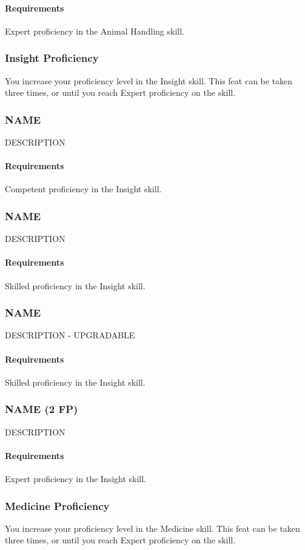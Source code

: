     \paragraph{Requirements} Expert proficiency in the Animal Handling skill.
\subsubsection{Insight Proficiency} \label{feat::insightprof}
    You increase your proficiency level in the Insight skill.
    This feat can be taken three times, or until you reach Expert proficiency on the skill.
\subsubsection{NAME} \label{feat::name}
    DESCRIPTION
    \paragraph{Requirements} Competent proficiency in the Insight skill.
\subsubsection{NAME} \label{feat::name}
    DESCRIPTION
    \paragraph{Requirements} Skilled proficiency in the Insight skill.
\subsubsection{NAME} \label{feat::name}
    DESCRIPTION - UPGRADABLE
    \paragraph{Requirements} Skilled proficiency in the Insight skill.
\subsubsection{NAME (2 FP)} \label{feat::name}
    DESCRIPTION
    \paragraph{Requirements} Expert proficiency in the Insight skill.
\subsubsection{Medicine Proficiency} \label{feat::medicineprof}
    You increase your proficiency level in the Medicine skill.
    This feat can be taken three times, or until you reach Expert proficiency on the skill.
